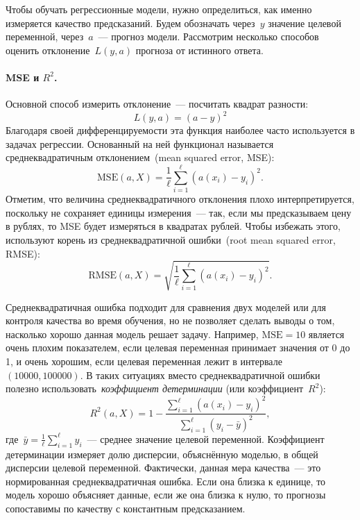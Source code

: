 \documentclass[12pt,fleqn]{article}
\begin{document}
Чтобы обучать регрессионные модели, нужно определиться, как именно измеряется качество предсказаний.
Будем обозначать через~$y$ значение целевой переменной, через~$a$~--- прогноз модели.
Рассмотрим несколько способов оценить отклонение~$L(y, a)$ прогноза от истинного ответа.

\paragraph{MSE и $R^2$.}

Основной способ измерить отклонение~--- посчитать квадрат разности:
\[
    L(y, a) = (a - y)^2
\]
Благодаря своей дифференцируемости эта функция наиболее часто используется в задачах регрессии.
Основанный на ней функционал называется среднеквадратичным отклонением~(mean squared error, MSE):
\[
    \text{MSE}(a, X)
    =
    \frac{1}{\ell}
    \sum_{i = 1}^{\ell} \left(
        a(x_i) - y_i
    \right)^2.
\]
Отметим, что величина среднеквадратичного отклонения плохо интерпретируется,
поскольку не сохраняет единицы измерения~--- так, если мы предсказываем цену
в рублях, то MSE будет измеряться в квадратах рублей.
Чтобы избежать этого, используют корень из среднеквадратичной ошибки~(root mean squared error, RMSE):
\[
    \text{RMSE}(a, X)
    =
    \sqrt{
        \frac{1}{\ell}
        \sum_{i = 1}^{\ell} \left(
            a(x_i) - y_i
        \right)^2
    }.
\]

Среднеквадратичная ошибка подходит для сравнения двух моделей
или для контроля качества во время обучения,
но не позволяет сделать выводы о том, насколько хорошо данная модель
решает задачу.
Например, $\text{MSE}=10$ является очень плохим показателем,
если целевая переменная принимает значения от 0 до 1,
и очень хорошим, если целевая переменная лежит в интервале~$(10000, 100000)$.
В таких ситуациях вместо среднеквадратичной ошибки полезно использовать~\emph{коэффициент детерминации}
(или коэффициент~$R^2$):
\[
    R^2(a, X)
    =
    1
    -
    \frac{
        \sum_{i = 1}^{\ell} (a(x_i) - y_i)^2
    }{
        \sum_{i = 1}^{\ell} (y_i - \bar y)^2
    },
\]
где~$\bar y = \frac{1}{\ell} \sum_{i = 1}^{\ell} y_i$~--- среднее значение целевой переменной.
Коэффициент детерминации измеряет долю дисперсии, объяснённую моделью, в общей дисперсии
целевой переменной.
Фактически, данная мера качества~--- это нормированная среднеквадратичная ошибка.
Если она близка к единице, то модель хорошо объясняет данные,
если же она близка к нулю, то прогнозы сопоставимы по качеству с константным предсказанием.
\end{document}
